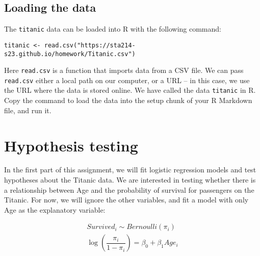 \documentclass[11pt]{article}
\begin{document}
\subsection*{Loading the data}

The \verb;titanic; data can be loaded into R with the following command:

\begin{verbatim}
titanic <- read.csv("https://sta214-s23.github.io/homework/Titanic.csv")
\end{verbatim}

\noindent Here \texttt{read.csv} is a function that imports data from a CSV file. We can pass \texttt{read.csv} either a local path on our computer, or a URL -- in this case, we use the URL where the data is stored online. We have called the data \verb;titanic; in R.\\

\noindent Copy the command to load the data into the setup chunk of your R Markdown file, and run it.

\newpage

\section{Hypothesis testing}

In the first part of this assignment, we will fit logistic regression models and test hypotheses about the Titanic data. We are interested in testing whether there is a relationship between Age and the probability of survival for passengers on the Titanic. For now, we will ignore the other variables, and fit a model with only Age as the explanatory variable:

\begin{align*}
Survived_i \sim Bernoulli(\pi_i) \\
\log \left( \dfrac{\pi_i}{1 - \pi_i} \right) = \beta_0 + \beta_1 Age_i
\end{align*}
\end{document}
